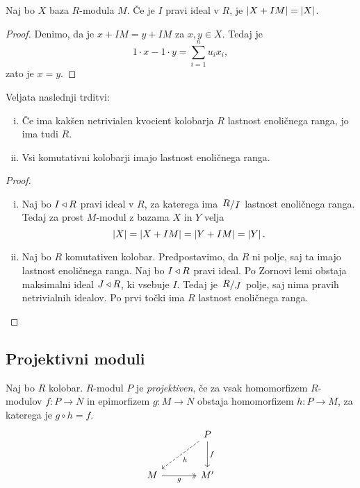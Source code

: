\begin{trditev}
Naj bo $X$ baza $R$-modula $M$. Če je $I$ pravi ideal v $R$, je
$\left\lvert X + IM\right\rvert = \left\lvert X\right\rvert$.
\end{trditev}

\begin{proof}
Denimo, da je $x + IM = y + IM$ za $x, y \in X$. Tedaj je
\[
1 \cdot x - 1 \cdot y = \sum_{i=1}^n u_i x_i,
\]
zato je $x = y$.
\end{proof}

\begin{izrek}
Veljata naslednji trditvi:

\begin{enumerate}[i)]
\item Če ima kakšen netrivialen kvocient kolobarja $R$ lastnost
enoličnega ranga, jo ima tudi $R$.
\item Vsi komutativni kolobarji imajo lastnost enoličnega ranga.
\end{enumerate}
\end{izrek}

\begin{proof}
\phantom{a}
\begin{enumerate}[i)]
\item Naj bo $I \triangleleft R$ pravi ideal v $R$, za katerega ima
$\kvoc{R}{I}$ lastnost enoličnega ranga. Tedaj za prost $M$-modul z
bazama $X$ in $Y$ velja
\[
\left\lvert X\right\rvert = \left\lvert X + IM\right\rvert = \left\lvert Y + IM\right\rvert = \left\lvert Y\right\rvert.
\]
\item Naj bo $R$ komutativen kolobar. Predpostavimo, da $R$ ni
polje, saj ta imajo lastnost enoličnega ranga. Naj bo $I \triangleleft R$
pravi ideal. Po Zornovi lemi obstaja maksimalni ideal $J \triangleleft R$,
ki vsebuje $I$. Tedaj je $\kvoc{R}{J}$ polje, saj nima pravih
netrivialnih idealov. Po prvi točki ima $R$ lastnost enoličnega
ranga. \qedhere
\end{enumerate}
\end{proof}

\newpage

\subsection{Projektivni moduli}


\begin{definicija}
Naj bo $R$ kolobar. $R$-modul $P$ je
\emph{projektiven}, če za vsak
homomorfizem $R$-modulov $f \colon P \to N$ in epimorfizem
$g \colon M \to N$ obstaja homomorfizem $h \colon P \to M$, za
katerega je $g \circ h = f$.
\[
\begin{tikzcd}[column sep=large, row sep=large]
& P \arrow[dl, dashrightarrow, "h"] \arrow[d, "f"] \\
M \arrow[r, two heads, "g"'] & M'
\end{tikzcd}
\]
\end{definicija}

